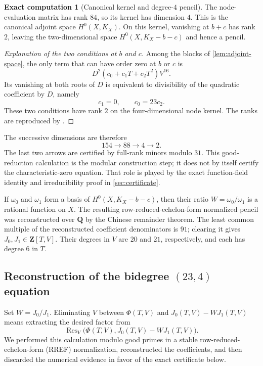 \documentclass[11pt]{amsart}
\theoremstyle{definition}
\newtheorem{computation}[computation]{Exact computation}
\theoremstyle{remark}
\newcommand{\QQ}{\mathbf Q}
\newcommand{\ZZ}{\mathbf Z}
\newcommand{\Res}{\operatorname{Res}}
\begin{document}
\begin{computation}[Canonical kernel and degree-$4$ pencil]\label{comp:kernel}
The node-evaluation matrix has rank $84$, so its kernel has dimension $4$.
This is the canonical adjoint space $H^0(X,K_X)$.  On this kernel, vanishing
at $b+c$ has rank $2$, leaving the two-dimensional space
$H^0(X,K_X-b-c)$ and hence a pencil.
\end{computation}

\begin{proof}[Explanation of the two conditions at $b$ and $c$]
Among the blocks of \cref{lem:adjoint-space}, the only term that can have
order zero at $b$ or $c$ is
\[
 D^2(c_0+c_1T+c_2T^2)V^{16}.
\]
Its vanishing at both roots of $D$ is equivalent to divisibility of the
quadratic coefficient by $D$, namely
\[
 c_1=0,\qquad c_0=23c_2.
\]
These two conditions have rank $2$ on the four-dimensional node kernel.
The ranks are reproduced by
.
\end{proof}

The successive dimensions are therefore
\[
154\longrightarrow88\longrightarrow4\longrightarrow2.
\]
The last two arrows are certified by full-rank minors modulo $31$.  This
good-reduction calculation is the modular construction step; it does not by
itself certify the characteristic-zero equation.  That role is played by
the exact function-field identity and irreducibility proof in
\cref{sec:certificate}.

If $\omega_0$ and $\omega_1$ form a basis of
$H^0(X,K_X-b-c)$, then their ratio $W=\omega_0/\omega_1$ is a rational
function on $X$.  The resulting row-reduced-echelon-form normalized pencil
was reconstructed over $\QQ$ by the Chinese remainder theorem.  The least
common multiple of the reconstructed coefficient denominators is $91$;
clearing it gives $J_0,J_1\in\ZZ[T,V]$.  Their degrees in $V$ are $20$ and
$21$, respectively, and each has degree $6$ in $T$.

\subsection{Reconstruction of the bidegree \texorpdfstring{$(23,4)$}{(23,4)} equation}
\label{sec:reconstruction}

Set $W=J_0/J_1$.  Eliminating $V$ between $\Phi(T,V)$ and
$J_0(T,V)-WJ_1(T,V)$ means extracting the desired factor from
\[
 \Res_V\!\bigl(\Phi(T,V),J_0(T,V)-WJ_1(T,V)\bigr).
\]
We performed this calculation modulo good primes in a stable
row-reduced-echelon-form (RREF) normalization, reconstructed the
coefficients, and then discarded the
numerical evidence in favor of the exact certificate below.
\end{document}
